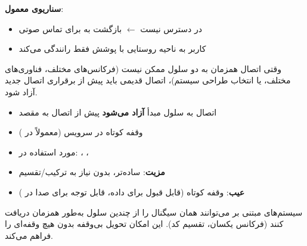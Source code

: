 \textbf{سناریوی معمول}:

\begin{itemize}
\tightlist
\item
   در دسترس نیست \ensuremath{\leftarrow} بازگشت  به  برای تماس صوتی
\item
  کاربر به ناحیه روستایی با پوشش فقط  رانندگی می‌کند
\end{itemize}



\CNchained{}

وقتی اتصال همزمان به دو سلول ممکن نیست (فرکانس‌های مختلف، فناوری‌های مختلف، یا انتخاب طراحی سیستم)، اتصال قدیمی باید پیش از برقراری اتصال جدید آزاد شود.


\begin{itemize}
\tightlist
\item
  اتصال به سلول مبدأ \textbf{آزاد می‌شود} پیش از اتصال به مقصد
\item
  وقفه کوتاه در سرویس (معمولاً  در )
\item
  مورد استفاده در: ، ، 
\end{itemize}




\begin{itemize}
\tightlist
\item
  \textbf{مزیت}: ساده‌تر، بدون نیاز به ترکیب/\allowbreak{}تقسیم
\item
  \textbf{عیب}: وقفه کوتاه (قابل قبول برای داده، قابل توجه برای صدا در )
\end{itemize}



\CNchained{}

سیستم‌های  مبتنی بر  می‌توانند همان سیگنال را از چندین سلول به‌طور همزمان دریافت کنند (فرکانس یکسان، تقسیم کد). این امکان تحویل بی‌وقفه بدون هیچ وقفه‌ای را فراهم می‌کند.

